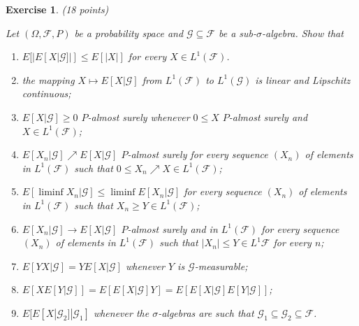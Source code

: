 \documentclass[DIV=classic,a4paper,10pt]{scrartcl}
\newtheorem{exercise}[theorem]{Exercise}
\theoremstyle{nonumberplain}
\numberwithin{equation}{section}
\begin{document}
\begin{exercise}(18 points)

    Let $(\Omega,\mathcal{F},P)$ be a probability space and $\mathcal{G}\subseteq \mathcal{F}$ be a sub-$\sigma$-algebra.
    Show that
    \begin{enumerate}[label=\textit{(\roman*)}]
        \item $E[|E[X|\mathcal{G}]|]\leq E[|X|]$ for every $X \in L^1(\mathcal{F})$.
        \item the mapping $X\mapsto E[X | \mathcal{G}]$ from $L^1(\mathcal{F})$ to $L^1(\mathcal{G})$ is linear and Lipschitz continuous;
        \item $E[X|\mathcal{G}]\geq 0$ $P$-almost surely whenever $0\leq X$ $P$-almost surely and $X \in L^1(\mathcal{F})$;
        \item $E[X_n|\mathcal{G}]\nearrow E[X|\mathcal{G}]$ $P$-almost surely for every sequence $(X_n)$ of elements in $L^1(\mathcal{F})$ such that $0\leq X_n\nearrow X\in L^1(\mathcal{F})$;
        \item $E[\liminf X_n |\mathcal{G}]\leq \liminf E[X_n|\mathcal{G}]$ for every sequence $(X_n)$ of elements in $L^1(\mathcal{F})$ such that $X_n\geq Y \in L^1(\mathcal{F})$;
        \item $E[X_n|\mathcal{G}]\to E[X|\mathcal{G}]$ $P$-almost surely and in $L^1(\mathcal{F})$ for every sequence $(X_n)$ of elements in $L^1(\mathcal{F})$ such that $|X_n|\leq Y\in L^1\mathcal{F}$ for every $n$;
        \item $E[YX|\mathcal{G}]=YE[X|\mathcal{G}]$ whenever $Y$ is $\mathcal{G}$-measurable;
        \item $E[XE[Y|\mathcal{G}]]=E[E[X|\mathcal{G}]Y]=E[E[X|\mathcal{G}]E[Y|\mathcal{G}]]$;
        \item $E[E[X|\mathcal{G}_2]|\mathcal{G}_1]$ whenever the $\sigma$-algebras are such that $\mathcal{G}_1\subseteq \mathcal{G}_2\subseteq \mathcal{F}$.
    \end{enumerate}
\end{exercise}
\end{document}
